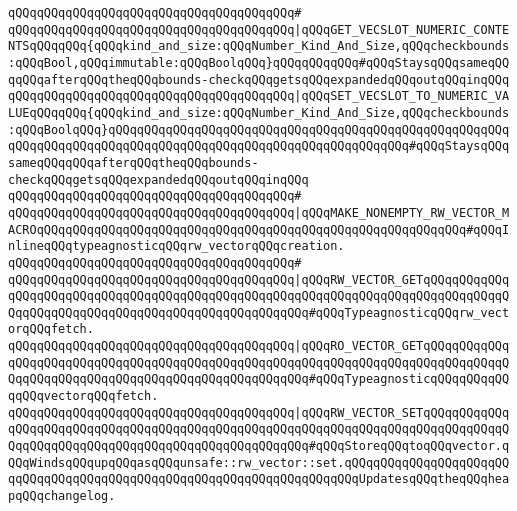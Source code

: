 \verb|qQQqqQQqqQQqqQQqqQQqqQQqqQQqqQQqqQQqqQQq#|\newline
\verb|qQQqqQQqqQQqqQQqqQQqqQQqqQQqqQQqqQQqqQQq|\verb#|qQQqGET_VECSLOT_NUMERIC_CONTENTSqQQqqQQq{qQQqkind_and_size:qQQqNumber_Kind_And_Size,qQQqcheckbounds:qQQqBool,qQQqimmutable:qQQqBoolqQQq}qQQqqQQqqQQq#\verb|#qQQqStaysqQQqsameqQQqqQQqafterqQQqtheqQQqbounds-checkqQQqgetsqQQqexpandedqQQqoutqQQqinqQQq|\newline
\verb|qQQqqQQqqQQqqQQqqQQqqQQqqQQqqQQqqQQqqQQq|\verb#|qQQqSET_VECSLOT_TO_NUMERIC_VALUEqQQqqQQq{qQQqkind_and_size:qQQqNumber_Kind_And_Size,qQQqcheckbounds:qQQqBoolqQQq}qQQqqQQqqQQqqQQqqQQqqQQqqQQqqQQqqQQqqQQqqQQqqQQqqQQqqQQqqQQqqQQqqQQqqQQqqQQqqQQqqQQqqQQqqQQqqQQqqQQqqQQqqQQqqQQq#\verb|#qQQqStaysqQQqsameqQQqqQQqafterqQQqtheqQQqbounds-checkqQQqgetsqQQqexpandedqQQqoutqQQqinqQQq|\newline
\verb|qQQqqQQqqQQqqQQqqQQqqQQqqQQqqQQqqQQqqQQq#|\newline
\verb|qQQqqQQqqQQqqQQqqQQqqQQqqQQqqQQqqQQqqQQq|\verb#|qQQqMAKE_NONEMPTY_RW_VECTOR_MACROqQQqqQQqqQQqqQQqqQQqqQQqqQQqqQQqqQQqqQQqqQQqqQQqqQQqqQQqqQQq#\verb|#qQQqInlineqQQqtypeagnosticqQQqrw_vectorqQQqcreation.|\newline
\verb|qQQqqQQqqQQqqQQqqQQqqQQqqQQqqQQqqQQqqQQq#|\newline
\verb|qQQqqQQqqQQqqQQqqQQqqQQqqQQqqQQqqQQqqQQq|\verb#|qQQqRW_VECTOR_GETqQQqqQQqqQQqqQQqqQQqqQQqqQQqqQQqqQQqqQQqqQQqqQQqqQQqqQQqqQQqqQQqqQQqqQQqqQQqqQQqqQQqqQQqqQQqqQQqqQQqqQQqqQQqqQQqqQQqqQQqqQQq#\verb|#qQQqTypeagnosticqQQqrw_vectorqQQqfetch.|\newline
\verb|qQQqqQQqqQQqqQQqqQQqqQQqqQQqqQQqqQQqqQQq|\verb#|qQQqRO_VECTOR_GETqQQqqQQqqQQqqQQqqQQqqQQqqQQqqQQqqQQqqQQqqQQqqQQqqQQqqQQqqQQqqQQqqQQqqQQqqQQqqQQqqQQqqQQqqQQqqQQqqQQqqQQqqQQqqQQqqQQqqQQqqQQq#\verb|#qQQqTypeagnosticqQQqqQQqqQQqqQQqvectorqQQqfetch.|\newline
\verb|qQQqqQQqqQQqqQQqqQQqqQQqqQQqqQQqqQQqqQQq|\verb#|qQQqRW_VECTOR_SETqQQqqQQqqQQqqQQqqQQqqQQqqQQqqQQqqQQqqQQqqQQqqQQqqQQqqQQqqQQqqQQqqQQqqQQqqQQqqQQqqQQqqQQqqQQqqQQqqQQqqQQqqQQqqQQqqQQqqQQqqQQq#\verb|#qQQqStoreqQQqtoqQQqvector.qQQqWindsqQQqupqQQqasqQQqunsafe::rw_vector::set.qQQqqQQqqQQqqQQqqQQqqQQqqQQqqQQqqQQqqQQqqQQqqQQqqQQqqQQqqQQqqQQqqQQqqQQqUpdatesqQQqtheqQQqheapqQQqchangelog.|\newline
